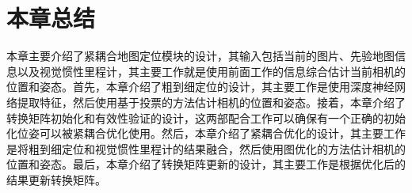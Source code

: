 \section{本章总结}
本章主要介绍了紧耦合地图定位模块的设计，其输入包括当前的图片、先验地图信息以及视觉惯性里程计，其主要工作就是使用前面工作的信息综合估计当前相机的位置和姿态。首先，本章介绍了粗到细定位的设计，其主要工作是使用深度神经网络提取特征，然后使用基于投票的方法估计相机的位置和姿态。接着，本章介绍了转换矩阵初始化和有效性验证的设计，这两部配合工作可以确保有一个正确的初始化位姿可以被紧耦合优化使用。然后，本章介绍了紧耦合优化的设计，其主要工作是将粗到细定位和视觉惯性里程计的结果融合，然后使用图优化的方法估计相机的位置和姿态。最后，本章介绍了转换矩阵更新的设计，其主要工作是根据优化后的结果更新转换矩阵。